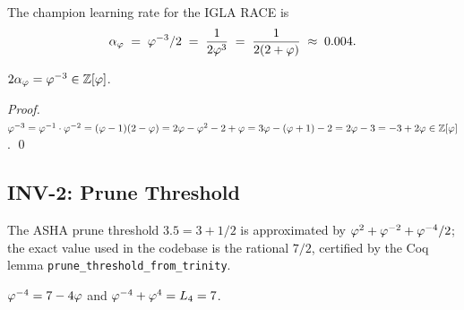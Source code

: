 The champion learning rate for the IGLA RACE is
\[
  \alpha_\varphi \;=\; \varphi^{-3}/2 \;=\; \frac{1}{2\varphi^3} \;=\;
  \frac{1}{2(2+\varphi)} \;\approx\; 0.004.
\]

\begin{lemma}\label{lem:alpha-phi}
  $2\alpha_\varphi = \varphi^{-3} \in \mathbb{Z}[\varphi]$.
\end{lemma}

\begin{proof}
  $\varphi^{-3} = \varphi^{-1} \cdot \varphi^{-2} = (\varphi-1)(2-\varphi)
  = 2\varphi - \varphi^2 - 2 + \varphi = 3\varphi - (\varphi+1) - 2
  = 2\varphi - 3 = -3 + 2\varphi \in \mathbb{Z}[\varphi]$.  \qed
\end{proof}

\subsection{INV-2: Prune Threshold}

The ASHA prune threshold $3.5 = 3 + 1/2$ is approximated by
$\varphi^{2} + \varphi^{-2} + \varphi^{-4}/2$; the exact value
used in the codebase is the rational $7/2$, certified by the
Coq lemma \texttt{prune\_threshold\_from\_trinity}.

\begin{lemma}\label{lem:inv2-derivation}
  $\varphi^{-4} = 7 - 4\varphi$ and $\varphi^{-4} + \varphi^{4} = L_4 = 7$.
\end{lemma}

